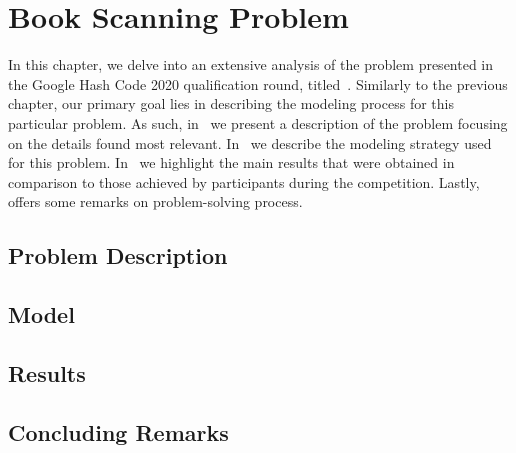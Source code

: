 \chapter{Book Scanning Problem}
\label{ch:book-scanning}


In this chapter, we delve into an extensive analysis of the problem presented in
the Google Hash Code 2020 qualification round,
titled~. Similarly to
the previous chapter, our primary goal lies in describing the modeling process
for this particular problem. As such, in~ we present a
description of the problem focusing on the details found most relevant.
In~ we describe the modeling strategy used for this
problem. In~ we highlight the main results that were
obtained in comparison to those achieved by participants during the
competition. Lastly,~ offers some remarks on
problem-solving process.

\section{Problem Description}
\label{sec:bs-problem}


\section{Model}
\label{sec:bs-model}


\section{Results}
\label{sec:bs-results}


\section{Concluding Remarks}
\label{sec:bs-concluding-remarks}
